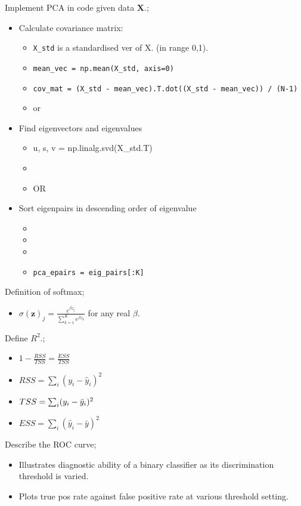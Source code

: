 \documentclass{article}
\begin{document}
Implement PCA in code given data $\mathbf{X}$.; \begin{itemize} \item Calculate covariance matrix: \begin{itemize} \item \texttt{X_std} is a standardised ver of X. (in range 0,1). \item \texttt{mean_vec = np.mean(X_std, axis=0)} \item \texttt{cov_mat = (X_std - mean_vec).T.dot((X_std - mean_vec)) / (N-1)} \item or  \end{itemize} \item Find eigenvectors and eigenvalues \begin{itemize} \item u, s, v = np.linalg.svd(X\_std.T) \item {} \item OR  \end{itemize} \item Sort eigenpairs in descending order of eigenvalue \begin{itemize} \item {} \item {} \item {} \item \texttt{pca_epairs = eig_pairs[:K]} \end{itemize} \end{itemize}

Definition of softmax; \begin{itemize} \item $\sigma(\mathbf{z})_j = \frac{e^{\beta z_j}}{\sum_{k=1}^Ke^{\beta z_k}}$ for any real $\beta$. \end{itemize}

Define $R^2$.; \begin{itemize} \item $1-\frac{RSS}{TSS} = \frac{ESS}{TSS}$ \item $RSS = \sum_i(y_i-\hat{y}_i)^2$ \item $TSS=\sum_i(y_i-\Bar{y}_i)^2$ \item $ESS=\sum_i(\hat{y}_i - \bar{y})^2$ \end{itemize}

Describe the ROC curve; \begin{itemize} \item Illustrates diagnostic ability of a binary classifier as its discrimination threshold is varied. \item Plots true pos rate against false positive rate at various threshold setting. \end{itemize} 
\end{document}
